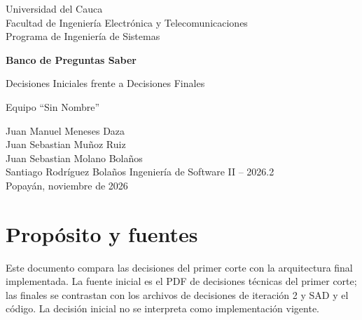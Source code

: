 \documentclass[12pt,a4paper]{article}
\begin{document}
\begin{titlepage}
\centering
{\Large Universidad del Cauca\\Facultad de Ingeniería Electrónica y Telecomunicaciones\\Programa de Ingeniería de Sistemas\par}
\vspace{2cm}
{\huge\bfseries Banco de Preguntas Saber\par}
\vspace{0.5cm}
{\Large Decisiones Iniciales frente a Decisiones Finales\par}
\vspace{1cm}
{Equipo ``Sin Nombre''\par}
\vspace{0.4cm}
Juan Manuel Meneses Daza\\Juan Sebastian Muñoz Ruiz\\Juan Sebastian Molano Bolaños\\Santiago Rodríguez Bolaños
\vfill
Ingeniería de Software II -- 2026.2\\Popayán, noviembre de 2026
\end{titlepage}
\tableofcontents\newpage

\section{Propósito y fuentes}
Este documento compara las decisiones del primer corte con la arquitectura final implementada. La fuente inicial es el PDF de decisiones técnicas del primer corte; las finales se contrastan con los archivos de decisiones de iteración 2 y SAD y el código. La decisión inicial no se interpreta como implementación vigente.
\end{document}
